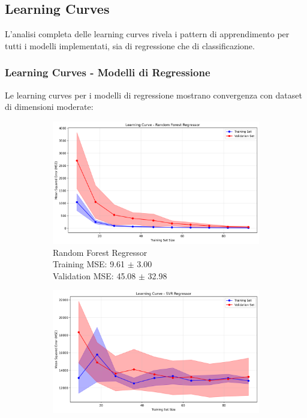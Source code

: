 \documentclass[12pt,a4paper]{article}
\begin{document}
\subsection{Learning Curves}

L'analisi completa delle learning curves rivela i pattern di apprendimento per tutti i modelli implementati, sia di regressione che di classificazione.

\subsubsection{Learning Curves - Modelli di Regressione}

Le learning curves per i modelli di regressione mostrano convergenza con dataset di dimensioni moderate:

\begin{figure}[H]
\centering
\begin{subfigure}{0.32\textwidth}
    \includegraphics[width=\textwidth]{dati/learning_curve_ricette_randomforest_regressor.png}
    \caption{Random Forest Regressor\\Training MSE: 9.61 $\pm$ 3.00\\Validation MSE: 45.08 $\pm$ 32.98}
\end{subfigure}
\hfill
\begin{subfigure}{0.32\textwidth}
    \includegraphics[width=\textwidth]{dati/learning_curve_ricette_svr.png}

\end{subfigure}
\end{figure}
\end{document}
